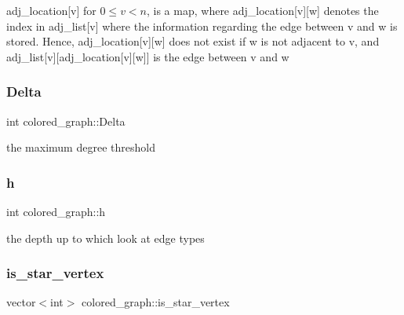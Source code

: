 adj\+\_\+location\mbox{[}v\mbox{]} for $0 \leq v < n$, is a map, where adj\+\_\+location\mbox{[}v\mbox{]}\mbox{[}w\mbox{]} denotes the index in adj\+\_\+list\mbox{[}v\mbox{]} where the information regarding the edge between v and w is stored. Hence, adj\+\_\+location\mbox{[}v\mbox{]}\mbox{[}w\mbox{]} does not exist if w is not adjacent to v, and adj\+\_\+list\mbox{[}v\mbox{]}\mbox{[}adj\+\_\+location\mbox{[}v\mbox{]}\mbox{[}w\mbox{]}\mbox{]} is the edge between v and w 

\mbox{\label{classcolored__graph_a5b0e93eb40a20dc815c809dee11edc12}} 
\subsubsection{\texorpdfstring{Delta}{Delta}}
{\footnotesize\ttfamily int colored\+\_\+graph\+::\+Delta}



the maximum degree threshold 

\mbox{\label{classcolored__graph_ae27062a4ee59df2670d3a0c81e85a3fa}} 
\subsubsection{\texorpdfstring{h}{h}}
{\footnotesize\ttfamily int colored\+\_\+graph\+::h}



the depth up to which look at edge types 

\mbox{\label{classcolored__graph_a00d0c64fcf8de58553aa4cade64193df}} 
\subsubsection{\texorpdfstring{is\+\_\+star\+\_\+vertex}{is\_star\_vertex}}
{\footnotesize\ttfamily vector$<$int$>$ colored\+\_\+graph\+::is\+\_\+star\+\_\+vertex}



